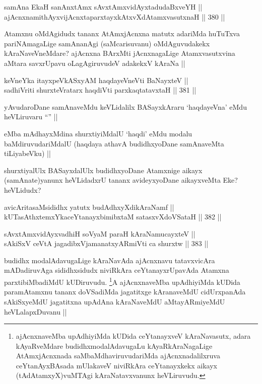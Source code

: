 \begin{shl}
samAna EkaH sanAnxtAmx sAvxtAmxvidAyxtadudaBxveYH ||  \\
ajAcnxnamithAyxvijAcnxtaparxtayxkAtxvXdAtamxvasutxnaH ||  380 ||  
\end{shl}

\begin{artha}
Atamxnu oMdAgidudx tananx AtAmxjAcnxna matutx adariMda huTuTxva pariNAmagaLige samAnanAgi (saMcarisuvanu) oMdAguvudakekx kAraNaveVneMdare? ajAcnxna BArxMti jAcnxnagaLige Atamxvasutxvina aMtara savxrUpavu oLagAgiruvudeV adakekxV kAraNa ||
\end{artha}


\begin{shl}
keVneYka itayxpeVkASxyAM haqdayeVneVti BaNayxteV ||  \\
sadhiVriti shurxteVratarx haqdiVti parxkaqtatavxtaH ||  381 ||  
\end{shl}

\begin{artha}
yAvudaroDane samAnaveMdu keVLidalilx BASayxkAraru `haqdayeVna' eMdu heVLiruvaru ``\stext'' ||
\end{artha}

\begin{artha}
eMba mAdhayxMdina shurxtiyiMdalU `haqdi' eMdu modalu baMdiruvudariMdalU (haqdaya athavA budidhxyoDane samAnaveMta tiLiyabeVku) ||
\end{artha}

\begin{artha}
shurxtiyalUlx BASayxdalUlx budidhxyoDane Atamxnige aikayx (samAnate)yanunx heVLidadxrU tananx avideyxyoDane aikayxveMta Eke? heVLidudx?
\end{artha}

\begin{shl}
avicAritasaMsididhx yatutx budAdhxyXdikAraNamf || \\
kUTasAthxtemxYkaceYtanayxbimibxtaM satasxvXdoVSataH ||  382 || 
\end{shl}
				
\begin{shl}
sAvxtAmxvidAyxvadhiH soV\s yaM paraH kAraNamucayxteV ||  \\
sAkiSxV ceVtA jagadibxVjamanatxyARmiVti ca shurxtw ||  383 ||  
\end{shl}

\begin{artha}
budidhx modalAdavugaLige kAraNavAda ajAcnxnavu tatavxvicAra mADadiruvAga sididhxsidudx niviRkAra ceYtanayxrUpavAda Atamxna parxtibiMbadiMdU kUDiruvudu. \footnote{ajAcnxnaveMba upAdhiyiMda kUDida ceYtanayxveV kAraNavasutx, adara kAyaRveMdare budidhxmodalAdavugaLu kAyaRkAraNagaLige AtAmxjAcnxnada saMbaMdhaviruvudariMda ajAcnxnadalilxruva ceYtanAyxBAsada mUlakaveV niviRkAra ceYtanayxkekx aikayx (tAdAtamxyX)vuMTAgi kAraNatavxvanunx heVLiruvudu.}A ajAcnxnaveMba upAdhiyiMda kUDida paramAtamxnu tananx doVSadiMda jagatitxge kAranaveMdU cidUrxpanAda sAkiSxyeMdU jagatitxna upAdAna kAraNaveMdU aMtayARmiyeMdU heVLalapxDuvanu ||
\end{artha}

